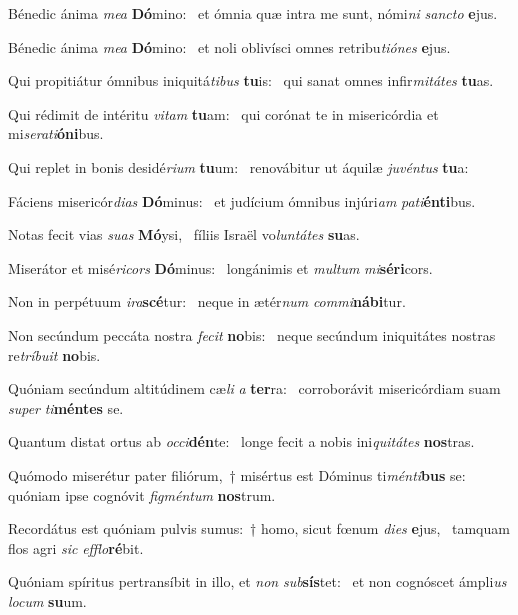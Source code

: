 \item Bénedic ánima \textit{mea} \textbf{Dó}mino:~\psstar{} et ómnia quæ intra me sunt, nómi\textit{ni} \textit{sancto} \textbf{e}jus.
\item Bénedic ánima \textit{mea} \textbf{Dó}mino:~\psstar{} et noli oblivísci omnes retribu\textit{tiónes} \textbf{e}jus.
\item Qui propitiátur ómnibus iniquitá\textit{tibus} \textbf{tu}is:~\psstar{} qui sanat omnes infir\textit{mitátes} \textbf{tu}as.
\item Qui rédimit de intéritu \textit{vitam} \textbf{tu}am:~\psstar{} qui corónat te in misericórdia et mi\textit{serati}\textbf{ó}\textbf{ni}bus.
\item Qui replet in bonis desidé\textit{rium} \textbf{tu}um:~\psstar{} renovábitur ut áquilæ \textit{juvéntus} \textbf{tu}a:
\item Fáciens misericór\textit{dias} \textbf{Dó}mi\-nus:~\psstar{} et judícium ómnibus injúri\textit{am} \textit{pati}\textbf{én}\textbf{ti}bus.
\item Notas fecit vias \textit{suas} \textbf{Mó}ysi,~\psstar{} fíliis Israël vo\textit{luntátes} \textbf{su}as.
\item Miserátor et misé\textit{ricors} \textbf{Dó}minus:~\psstar{} longánimis et \textit{multum} \textit{mi}\textbf{sé}\textbf{ri}cors.
\item Non in perpétuum \textit{ira}\textbf{scé}tur:~\psstar{} neque in ætér\textit{num} \textit{commi}\textbf{ná}\textbf{bi}tur.
\item Non secúndum peccáta nostra \textit{fecit} \textbf{no}bis:~\psstar{} neque secúndum iniquitátes nostras re\textit{tríbuit} \textbf{no}bis.
\item Quóniam secúndum altitúdinem cæ\textit{li} \textit{a} \textbf{ter}ra:~\psstar{} corroborávit misericórdiam suam \textit{super} \textit{ti}\textbf{mén}\textbf{tes} se.
\item Quantum distat ortus ab \textit{occi}\textbf{dén}te:~\psstar{} longe fecit a nobis ini\textit{quitátes} \textbf{nos}tras.
\item Quómodo miserétur pater filiórum,~† misértus est Dóminus ti\textit{ménti}\textbf{bus} se:~\psstar{} quóniam ipse cognóvit \textit{figméntum} \textbf{nos}trum.
\item Recordátus est quóniam pulvis sumus:~† homo, sicut fœnum \textit{dies} \textbf{e}jus,~\psstar{} tamquam flos agri \textit{sic} \textit{efflo}\textbf{ré}bit.
\item Quóniam spíritus pertransíbit in illo, et \textit{non} \textit{sub}\textbf{sís}tet:~\psstar{} et non cognóscet ámpli\textit{us} \textit{locum} \textbf{su}um.
